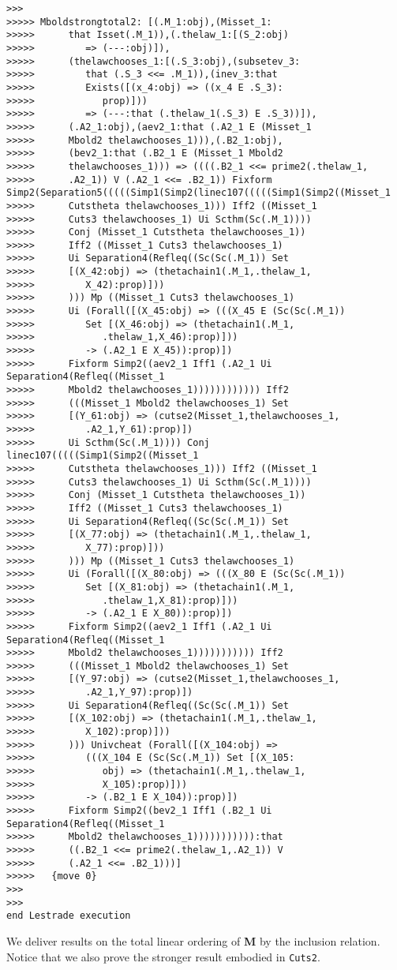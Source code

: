 \documentclass[12pt]{article}
\begin{document}
\begin{verbatim}
>>>
>>>>> Mboldstrongtotal2: [(.M_1:obj),(Misset_1:
>>>>>      that Isset(.M_1)),(.thelaw_1:[(S_2:obj)
>>>>>         => (---:obj)]),
>>>>>      (thelawchooses_1:[(.S_3:obj),(subsetev_3:
>>>>>         that (.S_3 <<= .M_1)),(inev_3:that
>>>>>         Exists([(x_4:obj) => ((x_4 E .S_3):
>>>>>            prop)]))
>>>>>         => (---:that (.thelaw_1(.S_3) E .S_3))]),
>>>>>      (.A2_1:obj),(aev2_1:that (.A2_1 E (Misset_1
>>>>>      Mbold2 thelawchooses_1))),(.B2_1:obj),
>>>>>      (bev2_1:that (.B2_1 E (Misset_1 Mbold2
>>>>>      thelawchooses_1))) => ((((.B2_1 <<= prime2(.thelaw_1,
>>>>>      .A2_1)) V (.A2_1 <<= .B2_1)) Fixform Simp2(Separation5(((((Simp1(Simp2(linec107(((((Simp1(Simp2((Misset_1
>>>>>      Cutstheta thelawchooses_1))) Iff2 ((Misset_1
>>>>>      Cuts3 thelawchooses_1) Ui Scthm(Sc(.M_1))))
>>>>>      Conj (Misset_1 Cutstheta thelawchooses_1))
>>>>>      Iff2 ((Misset_1 Cuts3 thelawchooses_1)
>>>>>      Ui Separation4(Refleq((Sc(Sc(.M_1)) Set
>>>>>      [(X_42:obj) => (thetachain1(.M_1,.thelaw_1,
>>>>>         X_42):prop)]))
>>>>>      ))) Mp ((Misset_1 Cuts3 thelawchooses_1)
>>>>>      Ui (Forall([(X_45:obj) => (((X_45 E (Sc(Sc(.M_1))
>>>>>         Set [(X_46:obj) => (thetachain1(.M_1,
>>>>>            .thelaw_1,X_46):prop)]))
>>>>>         -> (.A2_1 E X_45)):prop)])
>>>>>      Fixform Simp2((aev2_1 Iff1 (.A2_1 Ui Separation4(Refleq((Misset_1
>>>>>      Mbold2 thelawchooses_1)))))))))))) Iff2
>>>>>      (((Misset_1 Mbold2 thelawchooses_1) Set
>>>>>      [(Y_61:obj) => (cutse2(Misset_1,thelawchooses_1,
>>>>>         .A2_1,Y_61):prop)])
>>>>>      Ui Scthm(Sc(.M_1)))) Conj linec107(((((Simp1(Simp2((Misset_1
>>>>>      Cutstheta thelawchooses_1))) Iff2 ((Misset_1
>>>>>      Cuts3 thelawchooses_1) Ui Scthm(Sc(.M_1))))
>>>>>      Conj (Misset_1 Cutstheta thelawchooses_1))
>>>>>      Iff2 ((Misset_1 Cuts3 thelawchooses_1)
>>>>>      Ui Separation4(Refleq((Sc(Sc(.M_1)) Set
>>>>>      [(X_77:obj) => (thetachain1(.M_1,.thelaw_1,
>>>>>         X_77):prop)]))
>>>>>      ))) Mp ((Misset_1 Cuts3 thelawchooses_1)
>>>>>      Ui (Forall([(X_80:obj) => (((X_80 E (Sc(Sc(.M_1))
>>>>>         Set [(X_81:obj) => (thetachain1(.M_1,
>>>>>            .thelaw_1,X_81):prop)]))
>>>>>         -> (.A2_1 E X_80)):prop)])
>>>>>      Fixform Simp2((aev2_1 Iff1 (.A2_1 Ui Separation4(Refleq((Misset_1
>>>>>      Mbold2 thelawchooses_1))))))))))) Iff2
>>>>>      (((Misset_1 Mbold2 thelawchooses_1) Set
>>>>>      [(Y_97:obj) => (cutse2(Misset_1,thelawchooses_1,
>>>>>         .A2_1,Y_97):prop)])
>>>>>      Ui Separation4(Refleq((Sc(Sc(.M_1)) Set
>>>>>      [(X_102:obj) => (thetachain1(.M_1,.thelaw_1,
>>>>>         X_102):prop)]))
>>>>>      ))) Univcheat (Forall([(X_104:obj) =>
>>>>>         (((X_104 E (Sc(Sc(.M_1)) Set [(X_105:
>>>>>            obj) => (thetachain1(.M_1,.thelaw_1,
>>>>>            X_105):prop)]))
>>>>>         -> (.B2_1 E X_104)):prop)])
>>>>>      Fixform Simp2((bev2_1 Iff1 (.B2_1 Ui Separation4(Refleq((Misset_1
>>>>>      Mbold2 thelawchooses_1))))))))))):that
>>>>>      ((.B2_1 <<= prime2(.thelaw_1,.A2_1)) V
>>>>>      (.A2_1 <<= .B2_1)))]
>>>>>   {move 0}
>>>
>>>
end Lestrade execution
\end{verbatim}

We deliver results on the total linear ordering of {\bf M} by the inclusion relation.  Notice that we also prove the stronger result embodied in {\tt Cuts2}.
\end{document}
